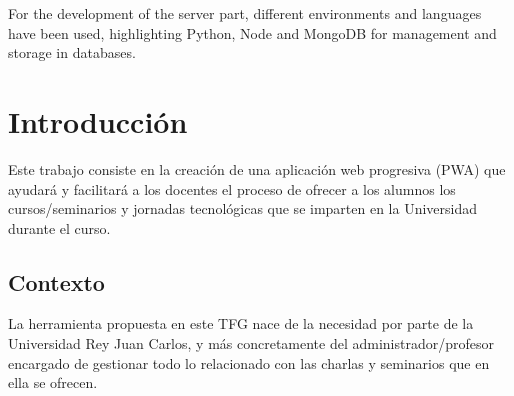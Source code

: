\documentclass[a4paper, 12pt]{book}
\begin{document}
	For the development of the server part, different environments and languages have been used, highlighting Python, Node and MongoDB for management and storage in databases.





\tableofcontents 
\cleardoublepage
\listoffigures %



\cleardoublepage
\chapter{Introducción}
\label{sec:intro} %

Este trabajo consiste en la creación de una aplicación web progresiva (PWA) que ayudará y facilitará a los docentes el proceso de ofrecer a los alumnos los cursos/seminarios y jornadas tecnológicas que se imparten en la Universidad durante el curso.


\section{Contexto}
\label{sec:contexto}
La herramienta propuesta en este TFG nace de la necesidad por parte de la Universidad Rey Juan Carlos, y más concretamente del administrador/profesor encargado de gestionar todo lo relacionado con las charlas y seminarios que en ella se ofrecen.
\end{document}
